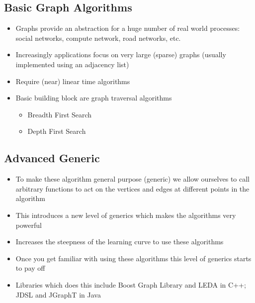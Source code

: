\begin{slide}
\section{Basic Graph Algorithms}

\begin{PauseHighLight}
  \begin{itemize}
  \item Graphs provide an abstraction for a huge number of real world
    processes: social networks, compute network, road networks, etc.\pause
  \item Increasingly applications focus on very large (sparse) graphs
    (usually implemented using an adjacency list)\pause
  \item Require (near) linear time algorithms\pause
  \item Basic building block are graph traversal algorithms
    \begin{itemize}
    \item Breadth First Search
    \item Depth First Search\pause
    \end{itemize}
  \end{itemize}
\end{PauseHighLight}

\end{slide}


\begin{slide}
\section[-2]{Advanced Generic}

\begin{PauseHighLight}
  \begin{itemize}
  \item To make these algorithm general purpose (generic) we allow
    ourselves to call arbitrary functions to act on the vertices and
    edges at different points in the algorithm\pause
  \item This introduces a new level of generics which makes the
    algorithms very powerful\pause
  \item Increases the steepness of the learning curve to use these
    algorithms\pause
  \item Once you get familiar with using these algorithms this level of
    generics starts to pay off\pause
  \item Libraries which does this include Boost Graph Library and LEDA
    in C++; JDSL and  JGraphT in Java\pause
  \end{itemize}
\end{PauseHighLight}

\end{slide}

